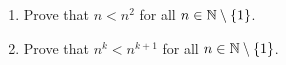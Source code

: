 \documentclass[../main.tex]{subfiles}
\begin{document}
\begin{enumerate}[ref={\thechapter.\arabic*}]
\begin{enumerate}[label={(\alph*)},ref={\theenumi\alph*}]
\begin{definition*}
        \end{definition*}
        \begin{enumerate}[ref={\theenumii-\roman*}]
            \item \label{axr:0.9f-i}Prove that $n<n^2$ for all $n\in\mathbb{N}\setminus\{1\}$.
            \item \label{axr:0.9f-ii}Prove that $n^k<n^{k+1}$ for all $n\in\mathbb{N}\setminus\{1\}$.
        \end{enumerate}
    \end{enumerate}
\end{enumerate}
\end{document}
